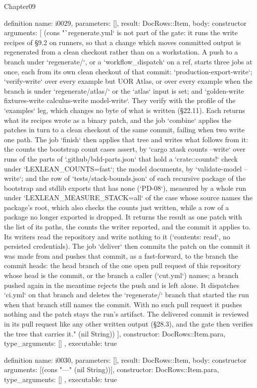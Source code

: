 \begin{lexlean}{Chapter09}
\begin{semanticmodule}
definition{
  name: i0029,
  parameters: [],
  result: DocRows::Item,
  body: constructor{
    arguments: [
      (cons "`regenerate.yml` is not part of the gate: it runs the write recipes of §9.2 on runners, so that a change which moves committed output is regenerated from a clean checkout rather than on a workstation. A push to a branch under `regenerate/`, or a `workflow_dispatch` on a ref, starts three jobs at once, each from its own clean checkout of that commit: `production-export-write`; `verify-write` over every example but UOR Atlas, or over every example when the branch is under `regenerate/atlas/` or the `atlas` input is set; and `golden-write fixtures-write calculus-write model-write`. They verify with the profile of the `examples` leg, which changes no byte of what is written (§22.11). Each returns what its recipes wrote as a binary patch, and the job `combine` applies the patches in turn to a clean checkout of the same commit, failing when two write one path. The job `finish` then applies that tree and writes what follows from it: the counts the bootstrap count cases assert, by `cargo xtask counts --write` over runs of the parts of `.github/bdd-parts.json` that hold a `crate::counts!` check under `LEXLEAN_COUNTS=fast`; the model documents, by `validate-model --write`; and the row of `tests/stack-bounds.json` of each recursive package of the bootstrap and stdlib exports that has none (`PD-08`), measured by a whole run under `LEXLEAN_MEASURE_STACK=all` of the case whose source names the package's root, which also checks the counts just written, while a row of a package no longer exported is dropped. It returns the result as one patch with the list of its paths, the counts the writer reported, and the commit it applies to. Its writers read the repository and write nothing to it (`contents: read`, no persisted credentials). The job `deliver` then commits the patch on the commit it was made from and pushes that commit, as a fast-forward, to the branch the commit heads: the head branch of the one open pull request of this repository whose head is the commit, or the branch a caller (`cut.yml`) names; a branch pushed again in the meantime rejects the push and is left alone. It dispatches `ci.yml` on that branch and deletes the `regenerate/` branch that started the run when that branch still names the commit. With no such pull request it pushes nothing and the patch stays the run's artifact. The delivered commit is reviewed in its pull request like any other written output (§28.3), and the gate then verifies the tree that carries it." (nil String))
    ],
    constructor: DocRows::Item.para,
    type_arguments: []
  },
  executable: true
}

definition{
  name: i0030,
  parameters: [],
  result: DocRows::Item,
  body: constructor{
    arguments: [(cons "---" (nil String))],
    constructor: DocRows::Item.para,
    type_arguments: []
  },
  executable: true
}
\end{semanticmodule}
\end{lexlean}
